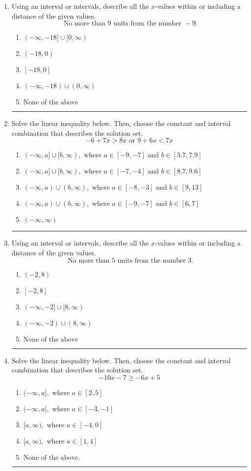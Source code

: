 \documentclass[14pt]{extbook}
\newcommand{\litem}[1]{\item#1\hspace*{-1cm}\rule{\textwidth}{0.4pt}}
\begin{document}
\begin{enumerate}
{\begin{enumerate}[label=\Alph*.]
\end{enumerate} }
\litem{
Using an interval or intervals, describe all the $x$-values within or including a distance of the given values.\[ \text{ No more than } 9 \text{ units from the number } -9. \]\begin{enumerate}[label=\Alph*.]
\item \( (-\infty, -18] \cup [0, \infty) \)
\item \( (-18, 0) \)
\item \( [-18, 0] \)
\item \( (-\infty, -18) \cup (0, \infty) \)
\item \( \text{None of the above} \)

\end{enumerate} }
\litem{
Solve the linear inequality below. Then, choose the constant and interval combination that describes the solution set.\[ -6 + 7 x > 8 x \text{ or } 9 + 6 x < 7 x \]\begin{enumerate}[label=\Alph*.]
\item \( (-\infty, a] \cup [b, \infty), \text{ where } a \in [-9, -7] \text{ and } b \in [5.7, 7.9] \)
\item \( (-\infty, a] \cup [b, \infty), \text{ where } a \in [-7, -4] \text{ and } b \in [8.7, 9.6] \)
\item \( (-\infty, a) \cup (b, \infty), \text{ where } a \in [-8, -3] \text{ and } b \in [9, 13] \)
\item \( (-\infty, a) \cup (b, \infty), \text{ where } a \in [-9, -7] \text{ and } b \in [6, 7] \)
\item \( (-\infty, \infty) \)

\end{enumerate} }
\litem{
Using an interval or intervals, describe all the $x$-values within or including a distance of the given values.\[ \text{ No more than } 5 \text{ units from the number } 3. \]\begin{enumerate}[label=\Alph*.]
\item \( (-2, 8) \)
\item \( [-2, 8] \)
\item \( (-\infty, -2] \cup [8, \infty) \)
\item \( (-\infty, -2) \cup (8, \infty) \)
\item \( \text{None of the above} \)

\end{enumerate} }
\litem{
Solve the linear inequality below. Then, choose the constant and interval combination that describes the solution set.\[ -10x -7 \geq -6x + 5 \]\begin{enumerate}[label=\Alph*.]
\item \( (-\infty, a], \text{ where } a \in [2, 5] \)
\item \( (-\infty, a], \text{ where } a \in [-3, -1] \)
\item \( [a, \infty), \text{ where } a \in [-4, 0] \)
\item \( [a, \infty), \text{ where } a \in [1, 4] \)
\item \( \text{None of the above}. \)

\end{enumerate} }
\end{enumerate}
\end{document}
